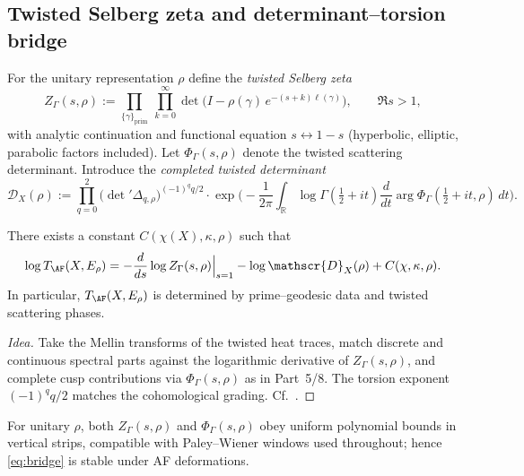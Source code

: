 \subsection{Twisted Selberg zeta and determinant–torsion bridge}
\label{subsec:twisted-zeta}
\relax\hspace{0pt}

For the unitary representation $\rho$ define the \emph{twisted Selberg zeta}
\begin{equation}\label{eq:twisted-selberg}
Z_\Gamma(s,\rho)
:= \prod_{\{\gamma\}_{\mathrm{prim}}}\ \prod_{k=0}^{\infty}
\det\!\big( I - \rho(\gamma)\, e^{-(s+k)\ell(\gamma)} \big),
\qquad \Re s>1,
\end{equation}
with analytic continuation and functional equation $s\leftrightarrow 1-s$ (hyperbolic, elliptic, parabolic factors included). Let $\Phi_\Gamma(s,\rho)$ denote the twisted scattering determinant. Introduce the \emph{completed twisted determinant}
\begin{equation}\label{eq:completed-twisted}
\mathscr{D}_X(\rho)
:= \prod_{q=0}^2 \big(\det{}'\!\Delta_{q,\rho}\big)^{(-1)^{q}q/2}
\cdot \exp\!\Big(
-\frac{1}{2\pi}\int_{\mathbb{R}}
\log\Gamma\!\left(\tfrac12+it\right)\frac{d}{dt}\arg\Phi_\Gamma\!\left(\tfrac12+it,\rho\right)\,dt\Big).
\end{equation}

\begin{theorem}
\label{thm:det-tor-bridge}
There exists a constant $C(\chi(X),\kappa,\rho)$ such that
\begin{equation}\label{eq:bridge}
\log T_{\AF}(X,E_\rho)
= -\frac{d}{ds}\log Z_\Gamma(s,\rho)\Big|_{s=1}
- \log \mathscr{D}_X(\rho) + C(\chi,\kappa,\rho).
\end{equation}
In particular, $T_{\AF}(X,E_\rho)$ is determined by prime–geodesic data and twisted scattering phases.
\end{theorem}

\begin{proof}[Idea]
Take the Mellin transforms of the twisted heat traces, match discrete and continuous spectral parts against the logarithmic derivative of $Z_\Gamma(s,\rho)$, and complete cusp contributions via $\Phi_\Gamma(s,\rho)$ as in Part~5/8. The torsion exponent $(-1)^{q}q/2$ matches the cohomological grading. Cf.\ \cite{Muller1992,HejhalII,Borthwick}. %
\end{proof}

\begin{remark}
For unitary $\rho$, both $Z_\Gamma(s,\rho)$ and $\Phi_\Gamma(s,\rho)$ obey uniform polynomial bounds in vertical strips, compatible with Paley–Wiener windows used throughout; hence \eqref{eq:bridge} is stable under AF deformations. %
\end{remark}

